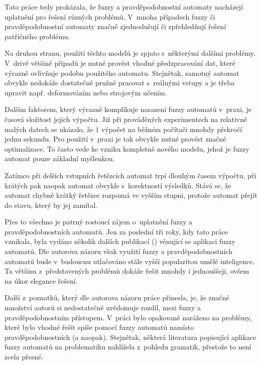 Tato práce tedy prokázala, že fuzzy a pravděpodobnostní automaty nacházejí uplatnění pro řešení různých problémů. V~mnoha případech fuzzy či pravděpodobnostní automaty značně zjednodušují či zpřehledňují řešení patřičného problému.

Na druhou stranu, použití těchto modelů je spjato s~některými dalšími problémy. V~drivé většině případů je nutné provést vhodné předzpracování dat, které výrazně ovlivňuje podobu použitého automatu. Stejnětak, samotný automat obvykle nedokáže dostatečně pružně pracovat s~reálnými vstupy a je třeba upravit např. deformováním nebo strojovým učením.

Dalším faktorem, který výrazně komplikuje nasazení fuzzy automatů v~praxi, je časová složitost jejich výpočtu. Již při prováděných experimentech na relativně malých datech se ukázalo, že $1$ výpočet na běžném počítači mnohdy překročí jednu sekundu. Pro použití v~praxi je tak obvykle nutné provést značné optimalizace. To často vede ke vzniku kompletně nového modelu, jehož je fuzzy automat pouze základní myšlenkou.

Zatímco při delších vstupních řetězcích automat trpí dlouhým časem výpočtu, při krátých pak naopak automat obvykle  s~korektností výsledků. Stává se, že automat chybně krátký řetězec rozpozná ve vyšším stupni, protože automat  přejít do stavu, který by jej zamítal.

Přes to všechno je patrný rostoucí zájem o~uplatnění fuzzy a pravděpodobnostních automatů. Jen za poslední tři roky, kdy tato práce vznikala, byla vydáno několik dalších publikací (\cite{MukRay-StaSplMerProbFiStaAuSigRepAna, ManPra-PriPatDetUsFiStMaFuzTra, Jia+-ExHeaSimMetBasIntHumTheMod, GupRah-CliMonUsFuzSys, CamMerNun-UsFuzAutDiagPrHeaPro}) věnující se aplikaci fuzzy automatů. Dle autorova názoru však využití fuzzy a pravděpodobnostních automatů bude v~budoucnu utlačováno stále vyšší popularitou umělé inteligence. Ta většinu z~představených problémů dokáže řešit mnohdy i jednouššeji, ovšem na úkor elegance řešení.

Další z~poznatků, který dle autorova názoru práce přinesla, je, že značné množství autorů si nedostatečně uvědomuje rozdíl, mezi fuzzy a pravděpodobnostním přístupem. V~práci bylo opakovaně naráženo na problémy, které bylo vhodné řešit spíše pomocí fuzzy automatů namísto pravděpodobnostních (a naopak). Stejnětak, některá literatura popisující aplikace fuzzy automatů na problematiku nahlížela z~pohledu gramatik, přestože to není zcela přesné.

% 
% 
% 
% 
% 
% 
% 
% 
% 
